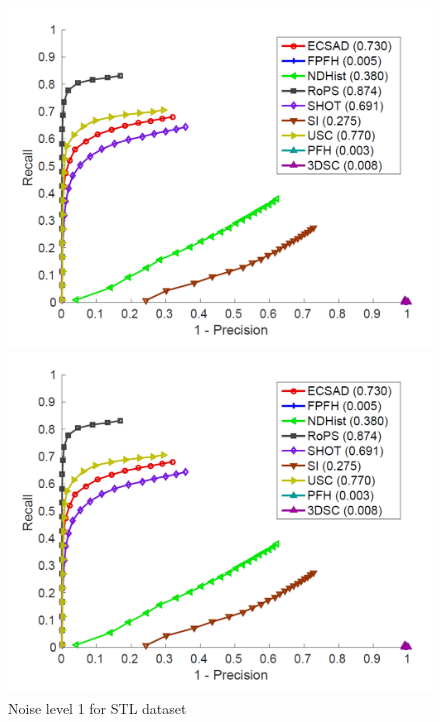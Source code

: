 \documentclass[10pt,twocolumn,letterpaper]{article}
\begin{document}
\begin{figure}[htp]
\centering
\begin{minipage}[b]{.3\textwidth}
\includegraphics[width=1.0\linewidth, height= 0.7\linewidth, keepaspectratio]{img/PRC_1.pdf} 
\caption{Noise level 1 for STL dataset}\label{fig:stl_n1}
\end{minipage}\qquad
\begin{minipage}[b]{.3\textwidth}
\includegraphics[width=1.0\linewidth, height= 1.0\linewidth, keepaspectratio]{img/PRC_1.pdf}

\end{minipage}
\end{figure}
\end{document}
